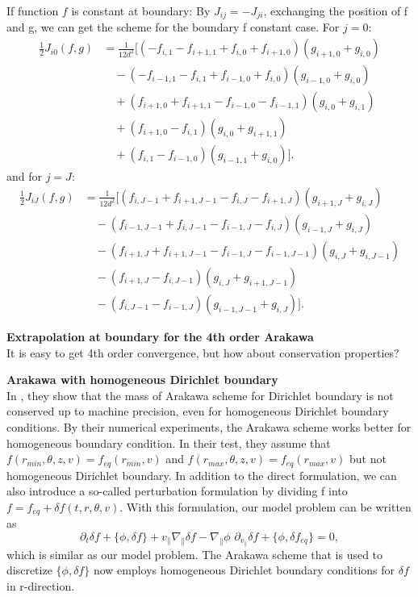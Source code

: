 If function $f$ is constant at boundary: By $J_{ij}=-J_{ji}$, exchanging the position of f and g, we can get the scheme for the boundary f constant case. For $j=0$:
\begin{equation}
	\begin{aligned}
		\frac{1}{2}J_{i0} (f,g) & = \frac{1}{12d^2}[(-f_{i,1}-f_{i+1,1}+f_{i,0}+f_{i+1,0})(g_{i+1,0}+g_{i,0})\\
		&\quad - (-f_{i-1,1}-f_{i,1}+f_{i-1,0}+f_{i,0})(g_{i-1,0}+g_{i,0})\\
		&\quad + (f_{i+1,0}+f_{i+1,1}-f_{i-1,0}-f_{i-1,1})(g_{i,0}+g_{i,1})\\
		&\quad + (f_{i+1,0}-f_{i,1})(g_{i,0}+g_{i+1,1})\\
		&\quad + (f_{i,1}-f_{i-1,0})(g_{i-1,1}+g_{i,0})].
	\end{aligned}
\end{equation}
and for $j=J$:
\begin{equation}
	\begin{aligned}
		\frac{1}{2}J_{iJ} (f,g) & = \frac{1}{12d^2}[(f_{i,J-1}+f_{i+1,J-1}-f_{i,J}-f_{i+1,J})(g_{i+1,J}+g_{i,J})\\
		& \quad - (f_{i-1,J-1}+f_{i,J-1}-f_{i-1,J}-f_{i,J})(g_{i-1,J}+g_{i,J})\\
		& \quad - (f_{i+1,J}+f_{i+1,J-1}-f_{i-1,J}-f_{i-1,J-1})(g_{i,J}+g_{i,J-1})\\
		& \quad - (f_{i+1,J}-f_{i,J-1})(g_{i,J}+g_{i+1,J-1})\\
		& \quad - (f_{i,J-1}-f_{i-1,J})(g_{i-1,J-1}+g_{i,J})].
	\end{aligned}
\end{equation}

\textbf{Extrapolation at boundary for the 4th order Arakawa}\\
It is easy to get 4th order convergence, but how about conservation properties? %

\textbf{Arakawa with homogeneous Dirichlet boundary}\\
In \cite{crouseilles2018exponential}, they show that the mass of Arakawa scheme for Dirichlet boundary is not conserved up to machine precision, even for homogeneous Dirichlet boundary conditions. By their numerical experiments, the Arakawa scheme works better for homogeneous boundary condition. In their test, they assume that $f(r_{min}, \theta,z,v)=f_{eq}(r_{min},v)$ and $f(r_{max}, \theta,z,v)=f_{eq}(r_{max},v)$ but not homogeneous Dirichlet boundary. In addition to the direct formulation, we can also introduce a so-called perturbation formulation by dividing f into $f=f_{eq}+\delta f(t,r,\theta,v)$. With this formulation, our model problem can be written as 
\begin{equation}
 \partial_t \delta f + \{\phi, \delta f \} + v_\parallel \nabla_\parallel \delta f - \nabla_\parallel \phi\,\, \partial_{v_\parallel} \delta f + \{\phi, \delta f_{eq} \}= 0,
\end{equation} 
which is similar as our model problem. The Arakawa scheme that is used to discretize $\{\phi, \delta f \}$ now employs homogeneous Dirichlet boundary conditions for $\delta f$ in r-direction.